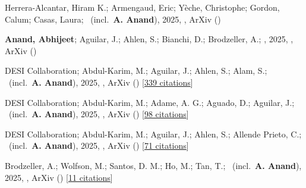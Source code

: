 \item[{\color{numcolor}\scriptsize8}] Herrera-Alcantar, Hiram K.; Armengaud, Eric; Y{\`e}che, Christophe; Gordon, Calum; Casas, Laura; \etal\ (incl.\ \textbf{A. Anand}), 2025, , ArXiv ()

\item[{\color{numcolor}\scriptsize7}] \textbf{Anand, Abhijeet}; Aguilar, J.; Ahlen, S.; Bianchi, D.; Brodzeller, A.; \etal, 2025, , ArXiv ()

\item[{\color{numcolor}\scriptsize6}] DESI Collaboration; Abdul-Karim, M.; Aguilar, J.; Ahlen, S.; Alam, S.; \etal\ (incl.\ \textbf{A. Anand}), 2025, , ArXiv () [\href{https://ui.adsabs.harvard.edu/abs/2025arXiv250314738D}{339 citations}]

\item[{\color{numcolor}\scriptsize5}] DESI Collaboration; Abdul-Karim, M.; Adame, A. G.; Aguado, D.; Aguilar, J.; \etal\ (incl.\ \textbf{A. Anand}), 2025, , ArXiv () [\href{https://ui.adsabs.harvard.edu/abs/2025arXiv250314745D}{98 citations}]

\item[{\color{numcolor}\scriptsize4}] DESI Collaboration; Abdul-Karim, M.; Aguilar, J.; Ahlen, S.; Allende Prieto, C.; \etal\ (incl.\ \textbf{A. Anand}), 2025, , ArXiv () [\href{https://ui.adsabs.harvard.edu/abs/2025arXiv250314739D}{71 citations}]

\item[{\color{numcolor}\scriptsize3}] Brodzeller, A.; Wolfson, M.; Santos, D. M.; Ho, M.; Tan, T.; \etal\ (incl.\ \textbf{A. Anand}), 2025, , ArXiv () [\href{https://ui.adsabs.harvard.edu/abs/2025arXiv250314740B}{11 citations}]

